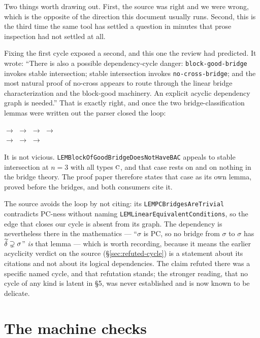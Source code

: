 Two things worth drawing out. First, the source was right and we were wrong,
which is the opposite of the direction this document usually runs. Second, this
is the third time the same tool has settled a question in minutes that prose
inspection had not settled at all.

\medskip

Fixing the first cycle exposed a second, and this one the review had predicted.
It wrote: ``There is also a possible dependency-cycle danger:
\texttt{block-good-bridge} invokes stable intersection; stable intersection
invokes \texttt{no-cross-bridge}; and the most natural proof of no-cross
appears to route through the linear bridge characterization and the block-good
machinery. An explicit acyclic dependency graph is needed.'' That is exactly
right, and once the two bridge-classification lemmas were written out the
parser closed the loop:
\begin{center}\footnotesize
{} $\to$  $\to$
 $\to$  $\to$\\[2pt]
 $\to$  $\to$
 $\to$ 
\end{center}
It is not vicious. \texttt{LEMBlockOfGoodBridgeDoesNotHaveBAC} appeals to
stable intersection at $n=3$ with all types $\textup{\textsc{c}}$, and that case rests on
\cite[Lem.~6.11]{ZhukStrong} and on nothing in the bridge theory. The proof
paper therefore states that case as its own lemma, proved before the bridges,
and both consumers cite it.

The source avoids the loop by not citing: its
\texttt{LEMPCBridgesAreTrivial} contradicts PC-ness without naming
\texttt{LEMLinearEquivalentConditions}, so the edge that closes our cycle is
absent from its graph. The dependency is nevertheless there in the mathematics
--- ``$\sigma$ is PC, so no bridge from $\sigma$ to $\sigma$ has
$\widetilde{\delta}\supsetneq\sigma$'' \emph{is} that lemma --- which is worth
recording, because it means the earlier acyclicity verdict on the source
(\S\ref{sec:refuted-cycle}) is a statement about its citations and not about
its logical dependencies. The claim refuted there was a specific named cycle,
and that refutation stands; the stronger reading, that no cycle of any kind is
latent in \S5, was never established and is now known to be delicate.

\section{The machine checks}\label{sec:machine-checks}


